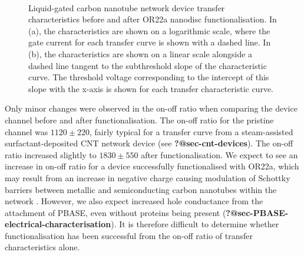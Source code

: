 \documentclass[
  a4paper,
]{scrbook}
\begin{document}
\begin{figure}
\begin{minipage}[t]{0.45\linewidth}
{{}

}

\end{minipage}%
%
\begin{minipage}[t]{0.01\linewidth}

{\centering 

~

}

\end{minipage}%

\caption{\label{fig-OR22a-TX-comparison}Liquid-gated carbon nanotube
network device transfer characteristics before and after OR22a nanodisc
functionalisation. In (a), the characteristics are shown on a
logarithmic scale, where the gate current for each transfer curve is
shown with a dashed line. In (b), the characteristics are shown on a
linear scale alongside a dashed line tangent to the subthreshold slope
of the characteristic curve. The threshold voltage corresponding to the
intercept of this slope with the x-axis is shown for each transfer
characteristic curve.}

\end{figure}

Only minor changes were observed in the on-off ratio when comparing the
device channel before and after functionalisation. The on-off ratio for
the pristine channel was \(1120\pm220\), fairly typical for a transfer
curve from a steam-assisted surfactant-deposited CNT network device (see
\textbf{?@sec-cnt-devices}). The on-off ratio increased slightly to
\(1830\pm550\) after functionalisation. We expect to see an increase in
on-off ratio for a device successfully functionalised with OR22a, which
may result from an increase in negative charge causing modulation of
Schottky barriers between metallic and semiconducting carbon nanotubes
within the network \autocite{Murugathas2019b}. However, we also expect
increased hole conductance from the attachment of PBASE, even without
proteins being present
(\textbf{?@sec-PBASE-electrical-characterisation}). It is therefore
difficult to determine whether functionalisation has been successful
from the on-off ratio of transfer characteristics alone.
\end{document}

